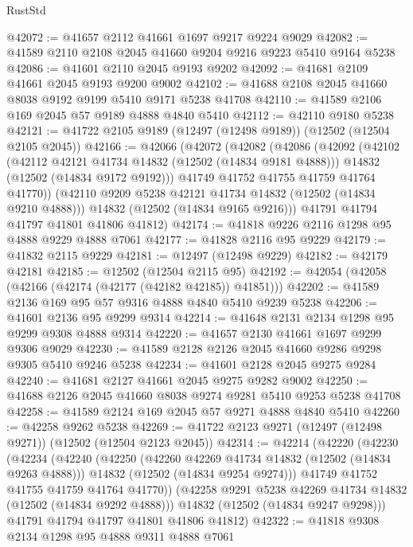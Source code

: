 \begin{lexlean}{RustStd}
\begin{coremodule}
@42072 := @41657 @2112 @41661 @1697 @9217 @9224 @9029
@42082 := @41589 @2110 @2108 @2045 @41660 @9204 @9216 @9223 @5410 @9164 @5238
@42086 := @41601 @2110 @2045 @9193 @9202
@42092 := @41681 @2109 @41661 @2045 @9193 @9200 @9002
@42102 := @41688 @2108 @2045 @41660 @8038 @9192 @9199 @5410 @9171 @5238 @41708
@42110 := @41589 @2106 @169 @2045 @57 @9189 @4888 @4840 @5410
@42112 := @42110 @9180 @5238
@42121 := @41722 @2105 @9189 (@12497 (@12498 @9189)) (@12502 (@12504 @2105 @2045))
@42166 := @42066
    (@42072
      (@42082
        (@42086
          (@42092
            (@42102
              (@42112 @42121 @41734 @14832 (@12502 (@14834 @9181 @4888)))
              @14832
              (@12502 (@14834 @9172 @9192)))
            @41749
            @41752
            @41755
            @41759
            @41764
            @41770))
        (@42110 @9209 @5238 @42121 @41734 @14832 (@12502 (@14834 @9210 @4888)))
        @14832
        (@12502 (@14834 @9165 @9216)))
      @41791
      @41794
      @41797
      @41801
      @41806
      @41812)
@42174 := @41818 @9226 @2116 @1298 @95 @4888 @9229 @4888 @7061
@42177 := @41828 @2116 @95 @9229
@42179 := @41832 @2115 @9229
@42181 := @12497 (@12498 @9229)
@42182 := @42179 @42181
@42185 := @12502 (@12504 @2115 @95)
@42192 := @42054 (@42058 (@42166 (@42174 (@42177 (@42182 @42185)) @41851)))
@42202 := @41589 @2136 @169 @95 @57 @9316 @4888 @4840 @5410 @9239 @5238
@42206 := @41601 @2136 @95 @9299 @9314
@42214 := @41648 @2131 @2134 @1298 @95 @9299 @9308 @4888 @9314
@42220 := @41657 @2130 @41661 @1697 @9299 @9306 @9029
@42230 := @41589 @2128 @2126 @2045 @41660 @9286 @9298 @9305 @5410 @9246 @5238
@42234 := @41601 @2128 @2045 @9275 @9284
@42240 := @41681 @2127 @41661 @2045 @9275 @9282 @9002
@42250 := @41688 @2126 @2045 @41660 @8038 @9274 @9281 @5410 @9253 @5238 @41708
@42258 := @41589 @2124 @169 @2045 @57 @9271 @4888 @4840 @5410
@42260 := @42258 @9262 @5238
@42269 := @41722 @2123 @9271 (@12497 (@12498 @9271)) (@12502 (@12504 @2123 @2045))
@42314 := @42214
    (@42220
      (@42230
        (@42234
          (@42240
            (@42250
              (@42260 @42269 @41734 @14832 (@12502 (@14834 @9263 @4888)))
              @14832
              (@12502 (@14834 @9254 @9274)))
            @41749
            @41752
            @41755
            @41759
            @41764
            @41770))
        (@42258 @9291 @5238 @42269 @41734 @14832 (@12502 (@14834 @9292 @4888)))
        @14832
        (@12502 (@14834 @9247 @9298)))
      @41791
      @41794
      @41797
      @41801
      @41806
      @41812)
@42322 := @41818 @9308 @2134 @1298 @95 @4888 @9311 @4888 @7061

\end{coremodule}
\end{lexlean}

